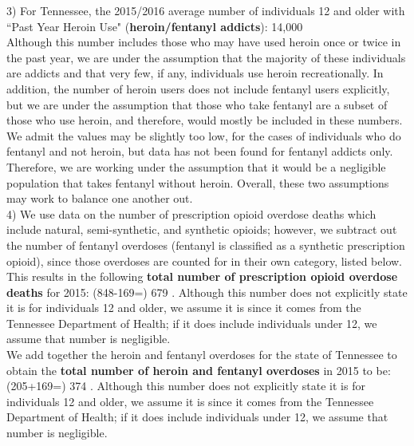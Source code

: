 \documentclass[12pt]{article}
\begin{document}
3) For Tennessee, the 2015/2016 average number of individuals 12 and older with ``Past Year Heroin Use" (\textbf{heroin/fentanyl addicts}): 14,000 \cite{NSDUH2}  \\ 
Although this number includes those who may have used heroin once or twice in the past year, we are under the assumption that the majority of these individuals are addicts and that very few, if any, individuals use heroin recreationally. In addition, the number of heroin users does not include fentanyl users explicitly, but we are under the assumption that those who take fentanyl are a subset of those who use heroin, and therefore, would mostly be included in these numbers. We admit the values may be slightly too low, for the cases of individuals who do fentanyl and not heroin, but data has not been found for fentanyl addicts only. Therefore, we are working under the assumption that it would be a negligible population that takes fentanyl without heroin. Overall, these two assumptions may work to balance one another out. 
\\

4) We use data on the number of prescription opioid overdose deaths which include natural, semi-synthetic, and synthetic opioids; however, we subtract out the number of fentanyl overdoses (fentanyl is classified as a synthetic prescription opioid), since those overdoses are counted for in their own category, listed below. This results in the following  \textbf{total number of prescription opioid overdose deaths} for 2015: (848-169=) 679 \cite{PDO}. Although this number does not explicitly state it is for individuals 12 and older, we assume it is since it comes from the Tennessee Department of Health; if it does include individuals under 12, we assume that number is negligible. \\

We add together the heroin and fentanyl overdoses for the state of Tennessee to obtain the \textbf{total number of heroin and fentanyl overdoses} in 2015 to be: (205+169=) 374 \cite{PDO}. Although this number does not explicitly state it is for individuals 12 and older, we assume it is since it comes from the Tennessee Department of Health; if it does include individuals under 12, we assume that number is negligible. \\
\end{document}
